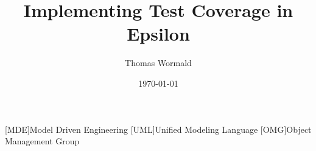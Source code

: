 \documentclass[authoryearcitations,11pt]{UoYCSproject}
\title{Implementing Test Coverage in Epsilon}
\author{Thomas Wormald}
\date{\today}
\begin{document}
\maketitle



[MDE]{Model Driven Engineering}
[UML]{Unified Modeling Language}
[OMG]{Object Management Group}












\nocite{*}

\appendix


\end{document}
